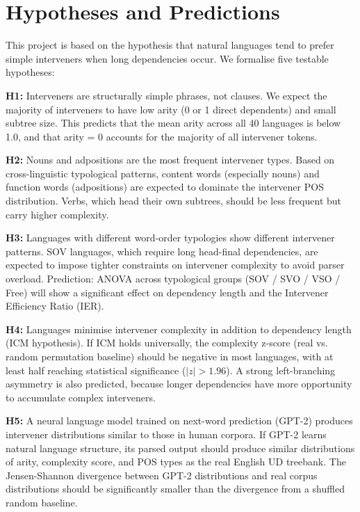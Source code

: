 \documentclass[11pt,a4paper]{article}
\begin{document}
\section{Hypotheses and Predictions}

This project is based on the hypothesis that natural languages tend to prefer simple interveners when long dependencies occur. We formalise five testable hypotheses:

\textbf{H1:} Interveners are structurally simple phrases, not clauses. We expect the majority of interveners to have low arity (0 or 1 direct dependents) and small subtree size. This predicts that the mean arity across all 40 languages is below 1.0, and that arity = 0 accounts for the majority of all intervener tokens.

\textbf{H2:} Nouns and adpositions are the most frequent intervener types. Based on cross-linguistic typological patterns, content words (especially nouns) and function words (adpositions) are expected to dominate the intervener POS distribution. Verbs, which head their own subtrees, should be less frequent but carry higher complexity.

\textbf{H3:} Languages with different word-order typologies show different intervener patterns. SOV languages, which require long head-final dependencies, are expected to impose tighter constraints on intervener complexity to avoid parser overload. Prediction: ANOVA across typological groups (SOV / SVO / VSO / Free) will show a significant effect on dependency length and the Intervener Efficiency Ratio (IER).

\textbf{H4:} Languages minimise intervener complexity in addition to dependency length (ICM hypothesis). If ICM holds universally, the complexity z-score (real vs. random permutation baseline) should be negative in most languages, with at least half reaching statistical significance ($|z| > 1.96$). A strong left-branching asymmetry is also predicted, because longer dependencies have more opportunity to accumulate complex interveners.

\textbf{H5:} A neural language model trained on next-word prediction (GPT-2) produces intervener distributions similar to those in human corpora. If GPT-2 learns natural language structure, its parsed output should produce similar distributions of arity, complexity score, and POS types as the real English UD treebank. The Jensen-Shannon divergence between GPT-2 distributions and real corpus distributions should be significantly smaller than the divergence from a shuffled random baseline.
\end{document}
